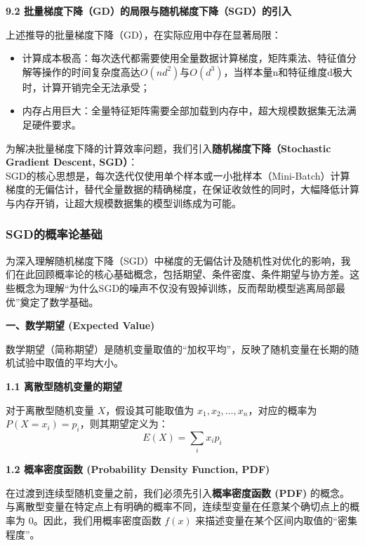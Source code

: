 \documentclass[10pt]{article}
\numberwithin{equation}{section}
\theoremstyle{plain}
\theoremstyle{definition}
\theoremstyle{remark}
\begin{document}
{\par\vspace{0.8ex}\noindent\normalsize\bfseries\color{secblue} 9.2 批量梯度下降（GD）的局限与随机梯度下降（SGD）的引入\par}
上述推导的批量梯度下降（GD），在实际应用中存在显著局限：
\begin{itemize}[leftmargin=*,nosep]
    \item 计算成本极高：每次迭代都需要使用全量数据计算梯度，矩阵乘法、特征值分解等操作的时间复杂度高达$O(n d^2)$与$O(d^3)$，当样本量n和特征维度d极大时，计算开销完全无法承受；
    \item 内存占用巨大：全量特征矩阵需要全部加载到内存中，超大规模数据集无法满足硬件要求。
\end{itemize}

为解决批量梯度下降的计算效率问题，我们引入\textbf{随机梯度下降（Stochastic Gradient Descent, SGD）}：\\
SGD的核心思想是，每次迭代仅使用单个样本或一小批样本（Mini-Batch）计算梯度的无偏估计，替代全量数据的精确梯度，在保证收敛性的同时，大幅降低计算与内存开销，让超大规模数据集的模型训练成为可能。


\subsubsection{SGD的概率论基础}
为深入理解随机梯度下降（SGD）中梯度的无偏估计及随机性对优化的影响，我们在此回顾概率论的核心基础概念，包括期望、条件密度、条件期望与协方差。这些概念为理解“为什么SGD的噪声不仅没有毁掉训练，反而帮助模型逃离局部最优”奠定了数学基础。

{\par\vspace{1ex}\noindent\large\bfseries\color{brandD} 一、数学期望 (Expected Value)\par}\par\vspace{0.5ex}
数学期望（简称期望）是随机变量取值的“加权平均”，反映了随机变量在长期的随机试验中取值的平均大小。

{\par\vspace{0.8ex}\noindent\normalsize\bfseries\color{secblue} 1.1 离散型随机变量的期望\par}
对于离散型随机变量 $X$，假设其可能取值为 $x_1, x_2, \dots, x_n$，对应的概率为 $P(X=x_i) = p_i$，则其期望定义为：
\[ \displaystyle E(X) = \sum_{i} x_i p_i \]

{\par\vspace{0.8ex}\noindent\normalsize\bfseries\color{accentD} 1.2 概率密度函数 (Probability Density Function, PDF)\par}
在过渡到连续型随机变量之前，我们必须先引入\textbf{概率密度函数 (PDF)} 的概念。与离散型变量在特定点上有明确的概率不同，连续型变量在任意某个确切点上的概率为 0。因此，我们用概率密度函数 $f(x)$ 来描述变量在某个区间内取值的“密集程度”。
\end{document}
